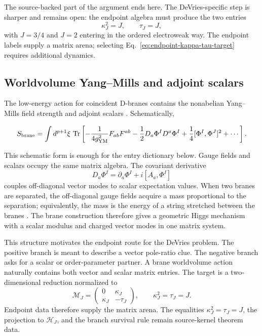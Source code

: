The source-backed part of the argument ends here.  The DeVries-specific step is sharper and remains open: the endpoint algebra must produce the two entries
\begin{equation}
  \kappa_J^2=J,
  \qquad
  \tau_J=J,
  \label{eq:endpoint-kappa-tau-target}
\end{equation}
with \(J=3/4\) and \(J=2\) entering in the ordered electroweak way.  The endpoint labels supply a matrix arena; selecting Eq.~\eqref{eq:endpoint-kappa-tau-target} requires additional dynamics.

\subsection{Worldvolume Yang--Mills and adjoint scalars}
\label{sec:worldvolume-ym}

The low-energy action for coincident D-branes contains the nonabelian Yang--Mills field strength and adjoint scalars \cite{TongString}.  Schematically,
\begin{widetext}
\begin{equation}
  S_{\rm brane}
  =
  \int d^{p+1}\xi\,
  \operatorname{Tr}
  \left[
  -\frac{1}{4g_{\rm YM}^2}F_{ab}F^{ab}
  -\frac12 D_a\Phi^I D^a\Phi^I
  +\frac14[\Phi^I,\Phi^J]^2
  +\cdots
  \right].
  \label{eq:brane-ym-schematic}
\end{equation}
\end{widetext}
This schematic form is enough for the entry dictionary below.  Gauge fields and scalars occupy the same matrix algebra.  The covariant derivative
\begin{equation}
  D_a\Phi^I=\partial_a\Phi^I+i[A_a,\Phi^I]
  \label{eq:brane-covariant-derivative}
\end{equation}
couples off-diagonal vector modes to scalar expectation values.  When two branes are separated, the off-diagonal gauge fields acquire a mass proportional to the separation; equivalently, the mass is the energy of a string stretched between the branes \cite{TongString}.  The brane construction therefore gives a geometric Higgs mechanism with a scalar modulus and charged vector modes in one matrix system.

This structure motivates the endpoint route for the DeVries problem.  The positive branch is meant to describe a vector pole-ratio clue.  The negative branch asks for a scalar or order-parameter partner.  A brane worldvolume action naturally contains both vector and scalar matrix entries.  The target is a two-dimensional reduction normalized to
\begin{equation}
  \mathcal M_J
  =
  \begin{pmatrix}
  0 & \kappa_J\\
  \kappa_J & -\tau_J
  \end{pmatrix},
  \qquad
  \kappa_J^2=\tau_J=J.
  \label{eq:brane-to-devries}
\end{equation}
Endpoint data therefore supply the matrix arena.  The equalities
\(\kappa_J^2=\tau_J=J\), the projection to \(\mathcal H_J\), and the branch
survival rule remain source-kernel theorem data.


